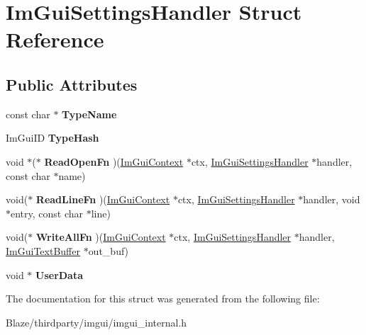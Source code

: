 \hypertarget{structImGuiSettingsHandler}{}\section{Im\+Gui\+Settings\+Handler Struct Reference}
\label{structImGuiSettingsHandler}
\subsection*{Public Attributes}
\begin{DoxyCompactItemize}
\item 
\mbox{\label{structImGuiSettingsHandler_a2b2821603e32a669c855dd97757c83c8}} 
const char $\ast$ {\bfseries Type\+Name}
\item 
\mbox{\label{structImGuiSettingsHandler_ac2dd47bdb91ae6f50afb5ac14222b552}} 
Im\+Gui\+ID {\bfseries Type\+Hash}
\item 
\mbox{\label{structImGuiSettingsHandler_accadc3cc1599382b55b58dac53df0b24}} 
void $\ast$($\ast$ {\bfseries Read\+Open\+Fn} )(\hyperlink{structImGuiContext}{Im\+Gui\+Context} $\ast$ctx, \hyperlink{structImGuiSettingsHandler}{Im\+Gui\+Settings\+Handler} $\ast$handler, const char $\ast$name)
\item 
\mbox{\label{structImGuiSettingsHandler_a0a02bad8569c2d9f22e1a532d1e2de60}} 
void($\ast$ {\bfseries Read\+Line\+Fn} )(\hyperlink{structImGuiContext}{Im\+Gui\+Context} $\ast$ctx, \hyperlink{structImGuiSettingsHandler}{Im\+Gui\+Settings\+Handler} $\ast$handler, void $\ast$entry, const char $\ast$line)
\item 
\mbox{\label{structImGuiSettingsHandler_a8f9d8923be4df1b5e6c17f9857b955f4}} 
void($\ast$ {\bfseries Write\+All\+Fn} )(\hyperlink{structImGuiContext}{Im\+Gui\+Context} $\ast$ctx, \hyperlink{structImGuiSettingsHandler}{Im\+Gui\+Settings\+Handler} $\ast$handler, \hyperlink{structImGuiTextBuffer}{Im\+Gui\+Text\+Buffer} $\ast$out\+\_\+buf)
\item 
\mbox{\label{structImGuiSettingsHandler_a4e8dc5a10948568680764a3cdaf9b102}} 
void $\ast$ {\bfseries User\+Data}
\end{DoxyCompactItemize}


The documentation for this struct was generated from the following file\+:\begin{DoxyCompactItemize}
\item 
Blaze/thirdparty/imgui/imgui\+\_\+internal.\+h\end{DoxyCompactItemize}
